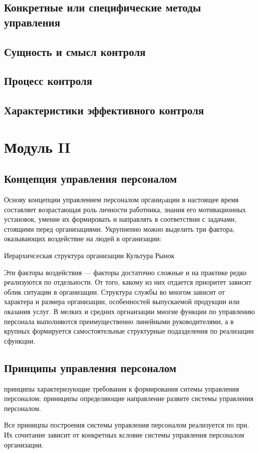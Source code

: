 \documentclass[a4paper,12pt,oneside,final]{extarticle}
\numberwithin{equation}{section}
\begin{document}
\subsection{Конкретные или специфические методы управления}

\subsection{Сущность и смысл контроля}

\subsection{Процесс контроля}

\subsection{Характеристики эффективного контроля}

%
%
\section{Модуль II}
\subsection{Концепция управления персоналом}
Основу концепции управлением персоналом органиpации в настоящее время составляет возрастающая роль личности работника, знания его мотивационных установок, умение их формировать и направлять в соответствии с задачами, стоящими перед организациями. 
Укрупненно можно выделить три фактора, оказывающих воздействие на людей в организации:
\begin{enumarate}
	Иерархичсеская структура организации
	Культура
	Рынок
\end{enumarate}
Эти факторы воздействия --- факторы достаточно сложные и на практике редко реализуются по отдельности. 
От того, какому из них отдается приоритет зависит облик ситуации в организации.
Структура службы во многом зависит от характера и размера организации, особенностей выпускаемой продукции или оказания услуг.
В мелких и средних оргнаизации многие функции по управлению персонала выполняются преимущественно линейными руководителями, а в крупных формируется самостоятельные структурные подазделения по реализации сфункции.

\subsection{Принципы управления персоналом}
\begin{itemize}
	принципы характеризующие требования к формирования ситемы управления персоналом;
	приниципы определяющие направление развите системы управления персоналом.
\end{itemize}
Все приницпы построения системы управления персоналом реализуется по при. Их сочитание зависит от конкретных ксловие системы управления персоналом организации.
\end{document}
